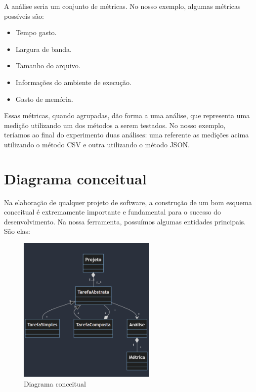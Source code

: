 \documentclass[12pt]{tcc}
\begin{document}
A análise seria um conjunto de métricas. No nosso exemplo, algumas métricas possíveis são:

\begin{itemize}
	\item Tempo gasto.
	\item Largura de banda.
	\item Tamanho do arquivo.
	\item Informações do ambiente de execução.
	\item Gasto de memória.
\end{itemize}

Essas métricas, quando agrupadas, dão forma a uma análise, que representa uma medição utilizando um dos métodos a serem testados. No nosso exemplo, teríamos ao final do experimento duas análises: uma referente as medições acima utilizando o método CSV e outra utilizando o método JSON.

\section{Diagrama conceitual}

Na elaboração de qualquer projeto de software, a construção de um bom esquema conceitual é extremamente importante e fundamental para o sucesso do desenvolvimento. Na nossa ferramenta, possuímos algumas entidades principais. São elas:

\begin{figure}[!ht]
	\centering
	\includegraphics[width=0.6\textwidth]{figures/diagrama-conceitual.png}
	\caption{Diagrama conceitual}
	\label{fig:diag-conceitual}
\end{figure}
\end{document}
